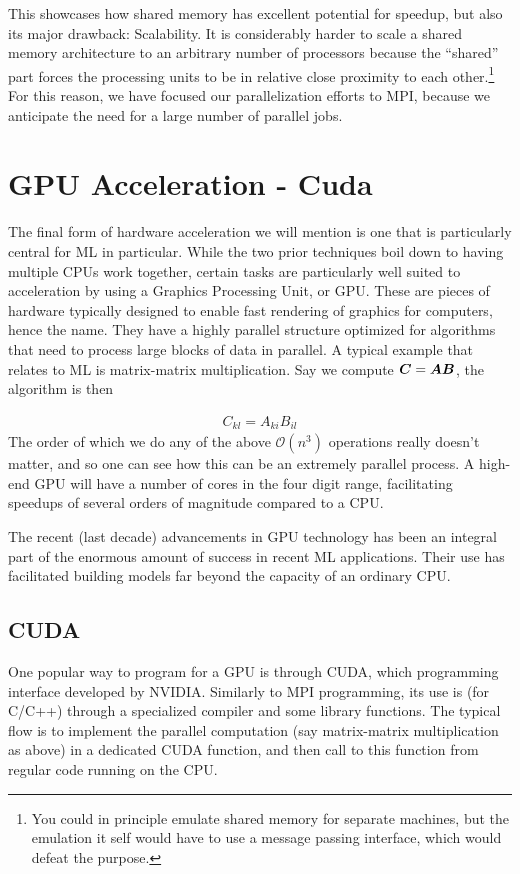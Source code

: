 \documentclass[Thesis.tex]{subfiles}
\begin{document}
This showcases how shared memory has excellent potential for speedup, but also
its major drawback: Scalability. It is considerably harder to scale a shared
memory architecture to an arbitrary number of processors because the ``shared''
part forces the processing units to be in relative close proximity to each
other.\footnote{You could in principle emulate shared memory for separate
  machines, but the emulation it self would have to use a message passing
  interface, which would defeat the purpose.} For this reason, we have focused
our parallelization efforts to MPI, because we anticipate the need for a large
number of parallel jobs.


\section{GPU Acceleration - Cuda}

The final form of hardware acceleration we will mention is one that is
particularly central for ML in particular. While the two prior techniques boil
down to having multiple CPUs work together, certain tasks are particularly well
suited to acceleration by using a Graphics Processing Unit, or GPU. These are
pieces of hardware typically designed to enable fast rendering of graphics for
computers, hence the name. They have a highly parallel structure optimized for
algorithms that need to process large blocks of data in parallel. A typical
example that relates to ML is matrix-matrix multiplication. Say we compute $\bm{C} = \bm{A} \bm{B}$, the algorithm is then

\begin{align}
  C_{kl} = A_{ki}B_{il}
\end{align}
The order of which we do any of the above $\mathcal{O}(n^3)$ operations really
doesn't matter, and so one can see how this can be an extremely parallel
process. A high-end GPU will have a number of cores in the four digit range,
facilitating speedups of several orders of magnitude compared to a CPU. 

The recent (last decade) advancements in GPU technology has been an integral
part of the enormous amount of success in recent ML applications. Their use has
facilitated building models far beyond the capacity of an ordinary CPU.

\subsection{CUDA}

One popular way to program for a GPU is through CUDA, which programming
interface developed by NVIDIA. Similarly to MPI programming, its use is (for
C/C++) through a specialized compiler and some library functions. The typical
flow is to implement the parallel computation (say matrix-matrix multiplication
as above) in a dedicated CUDA function, and then call to this function from
regular code running on the CPU.
\end{document}
